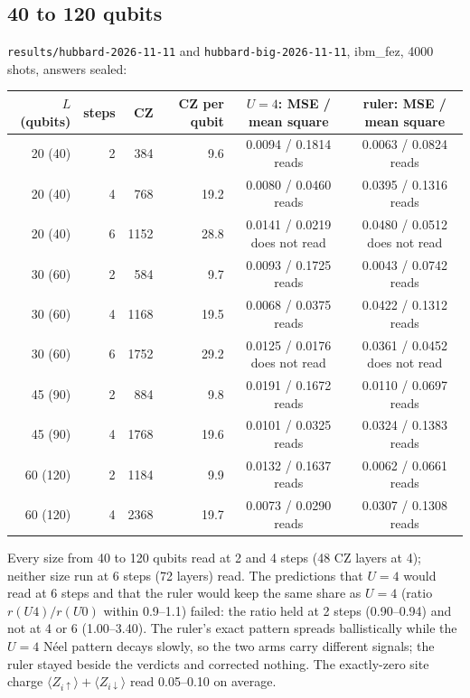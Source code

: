 \documentclass[10pt,a4paper]{article}
\begin{document}
\subsection{40 to 120 qubits}
\texttt{results/hubbard-2026-11-11} and \texttt{hubbard-big-2026-11-11}, ibm\_fez, 4000 shots, answers sealed:

\begin{center}\small
\begin{tabular}{rrrrcc}
\toprule
$L$ (qubits) & steps & CZ & CZ per qubit & $U=4$: MSE / mean square & ruler: MSE / mean square \\
\midrule
20 (40) & 2 & 384 & 9.6 & 0.0094 / 0.1814 reads & 0.0063 / 0.0824 reads \\
20 (40) & 4 & 768 & 19.2 & 0.0080 / 0.0460 reads & 0.0395 / 0.1316 reads \\
20 (40) & 6 & 1152 & 28.8 & 0.0141 / 0.0219 does not read & 0.0480 / 0.0512 does not read \\
30 (60) & 2 & 584 & 9.7 & 0.0093 / 0.1725 reads & 0.0043 / 0.0742 reads \\
30 (60) & 4 & 1168 & 19.5 & 0.0068 / 0.0375 reads & 0.0422 / 0.1312 reads \\
30 (60) & 6 & 1752 & 29.2 & 0.0125 / 0.0176 does not read & 0.0361 / 0.0452 does not read \\
45 (90) & 2 & 884 & 9.8 & 0.0191 / 0.1672 reads & 0.0110 / 0.0697 reads \\
45 (90) & 4 & 1768 & 19.6 & 0.0101 / 0.0325 reads & 0.0324 / 0.1383 reads \\
60 (120) & 2 & 1184 & 9.9 & 0.0132 / 0.1637 reads & 0.0062 / 0.0661 reads \\
60 (120) & 4 & 2368 & 19.7 & 0.0073 / 0.0290 reads & 0.0307 / 0.1308 reads \\
\bottomrule
\end{tabular}
\end{center}

Every size from 40 to 120 qubits read at 2 and 4 steps (48 CZ layers at 4); neither size run at 6 steps (72 layers)
read. The predictions that $U = 4$ would read at 6 steps and that the ruler would keep the same share as $U = 4$ (ratio
$r(U4)/r(U0)$ within 0.9--1.1) failed: the ratio held at 2 steps (0.90--0.94) and not at 4 or 6 (1.00--3.40). The
ruler's exact pattern spreads ballistically while the $U = 4$ N\'eel pattern decays slowly, so the two arms carry
different signals; the ruler stayed beside the verdicts and corrected nothing. The exactly-zero site charge
$\langle Z_{i\uparrow}\rangle + \langle Z_{i\downarrow}\rangle$ read 0.05--0.10 on average.
\end{document}

